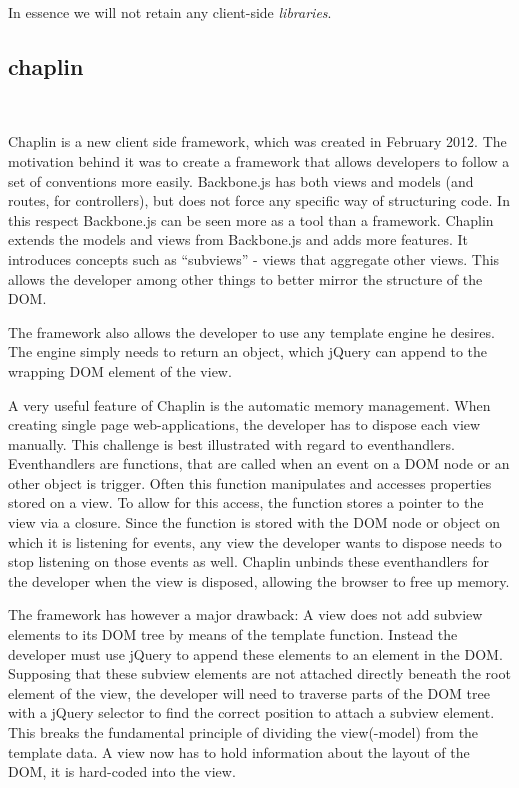 \documentclass[thesis.tex]{subfiles}
\begin{document}
In essence we will not retain any client-side \emph{libraries}.



\subsection{chaplin}

\

Chaplin is a new client side framework, which was created in February 2012.
The motivation behind it was to create a framework that allows developers to
follow a set of conventions more easily. Backbone.js has both views and models
(and routes, for controllers), but does not force any specific way of
structuring code. In this respect Backbone.js can be seen more as a tool than a
framework.
Chaplin extends the models and views from Backbone.js and adds more features.
It introduces concepts such as ``subviews'' - views that aggregate other views.
This allows the developer among other things to better mirror the structure of
the DOM.

The framework also allows the developer to use any template engine he desires.
The engine simply needs to return an object, which jQuery can append to the
wrapping DOM element of the view.

A very useful feature of Chaplin is the automatic memory management.
When creating single page web-applications, the developer has to dispose each
view manually. This challenge is best illustrated with regard to eventhandlers.
Eventhandlers are functions, that are called when an event on a DOM node or
an other object is trigger. Often this function manipulates and accesses
properties stored on a view. To allow for this access, the function stores a
pointer to the view via a closure. Since the function is stored with the
DOM node or object on which it is listening for events, any view the developer
wants to dispose needs to stop listening on those events as well.
Chaplin unbinds these eventhandlers for the developer when the view is disposed,
allowing the browser to free up memory.

The framework has however a major drawback: A view does not add subview elements
to its DOM tree by means of the template function. Instead the developer
must use jQuery to append these elements to an element in the DOM.
Supposing that these subview elements are not attached directly beneath the root
element of the view, the developer will need to traverse parts of the DOM tree
with a jQuery selector to find the correct position to attach a subview element.
This breaks the fundamental principle of dividing the view(-model) from the
template data. A view now has to hold information about the layout of the DOM,
it is hard-coded into the view.
\end{document}
